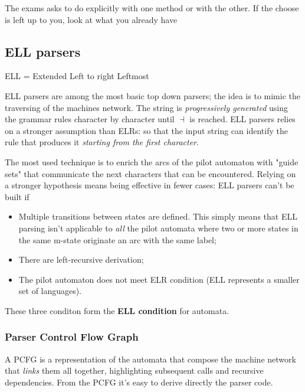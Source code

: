 			The exams asks to do explicitly with one method or with the other. If the choose is left up to you, look at what you already have %
		\subsection{ELL parsers}
			ELL = Extended Left to right Leftmost

			ELL parsers are among the most basic top down parsers; the idea is to mimic the traversing of the machines network. The string is 
			\emph{progressively generated} using the grammar rules character by character until $\dashv$ is reached. ELL parsers relies on a stronger assumption 
			than ELRs: so that the input string can identify the rule that produces it \emph{starting from the first character}.

			The most used technique is to enrich the arcs of the pilot automaton with "guide sets" that communicate the next characters that can be encountered. 
			Relying on a stronger hypothesis means being effective in fewer cases: ELL parsers can't be built if
			\begin{itemize}
				\item Multiple transitions between states are defined. This simply means that ELL parsing isn't applicable to \emph{all} the pilot automata where 
				two or more states in the same m-state originate an arc with the same label;
				\item There are left-recursive derivation;
				\item The pilot automaton does not meet ELR condition (ELL represents a smaller set of languages). 
			\end{itemize}
			These three conditon form the \textbf{ELL condition} for automata.
			
			\subsubsection{Parser Control Flow Graph}
				A PCFG is a representation of the automata that compose the machine network that \emph{links} them all together, highlighting subsequent calls 
				and recursive dependencies. From the PCFG it's easy to derive directly the parser code.

